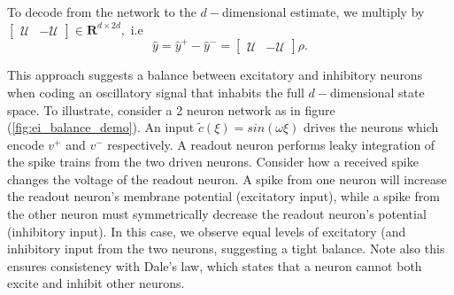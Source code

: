 \begin{enumerate}
To decode from the network to the $d-$dimensional estimate, we multiply by $ \begin{bmatrix}
\mathcal{U} & -\mathcal{U}
\end{bmatrix} \in \mathbf{R}^{d \times 2d},$ i.e 
$$
\hat{y} = \hat{y}^+ - \hat{y}^- = \begin{bmatrix}
\mathcal{U} & -\mathcal{U}
\end{bmatrix} \rho.
$$
\clearpage



This approach suggests a balance between excitatory and inhibitory neurons when coding an oscillatory signal that inhabits the full $d-$dimensional state space. To illustrate, consider a 2 neuron network as in figure (\ref{fig:ei_balance_demo}). An input $\tilde{c}(\xi) = sin(\omega \xi)$ drives the neurons which encode $v^+$ and $v^-$ respectively. A readout neuron performs leaky integration of the spike trains from the two driven neurons. Consider how a received spike changes the voltage of the readout neuron. A spike from one neuron will increase the readout neuron's membrane potential (excitatory input), while a spike from the other neuron must symmetrically decrease the readout neuron's potential (inhibitory input). In this case, we observe equal levels of excitatory (and inhibitory input from the two neurons, suggesting a tight balance. Note also this ensures consistency with Dale's law, which states that a neuron cannot both excite and inhibit other neurons. 

\begin{figure}
\centering


\end{figure}
\end{enumerate}
